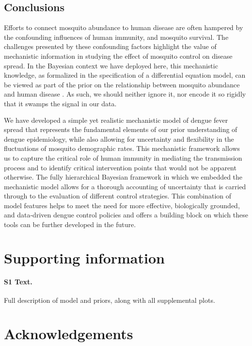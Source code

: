 \documentclass[10pt,letterpaper]{article}
\begin{document}
\subsection*{Conclusions}

Efforts to connect mosquito abundance to human disease are often hampered by the confounding influences of human immunity, and mosquito survival.
The challenges presented by these confounding factors highlight the value of mechanistic information in studying the effect of mosquito control on disease spread.
In the Bayesian context we have deployed here, this mechanistic knowledge, as formalized in the specification of a differential equation model, can be viewed as part of the prior on the relationship between mosquito abundance and human disease \cite{Ellner1998, Wikle2010}.
As such, we should neither ignore it, nor encode it so rigidly that it swamps the signal in our data.

We have developed a simple yet realistic mechanistic model of dengue fever spread that represents the fundamental elements of our prior understanding of dengue epidemiology, while also allowing for uncertainty and flexibility in the fluctuations of mosquito demographic rates.
This mechanistic framework allows us to capture the critical role of human immunity in mediating the transmission process and to identify critical intervention points that would not be apparent otherwise.
The fully hierarchical Bayesian framework in which we embedded the mechanistic model allows for a thorough accounting of uncertainty that is carried through to the evaluation of different control strategies.
This combination of model features helps to meet the need for more effective, biologically grounded, and data-driven dengue control policies and offers a building block on which these tools can be further developed in the future.

\section*{Supporting information}

\paragraph*{S1 Text.}
\label{S1}
{Full description of model and priors, along with all supplemental plots.}

\section*{Acknowledgements}
\end{document}
